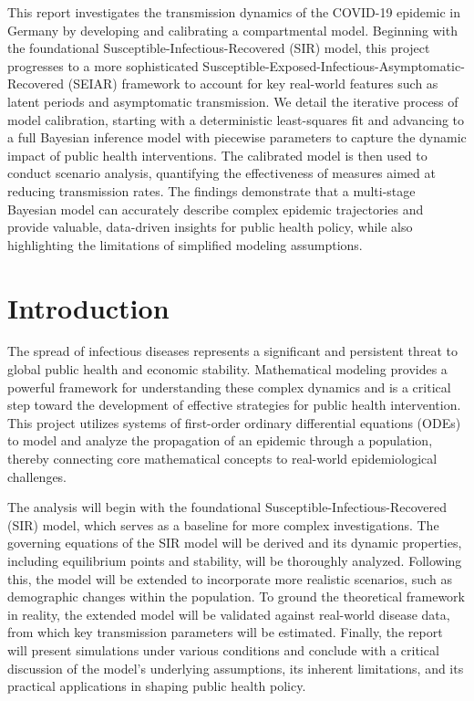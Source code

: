 \documentclass[12pt, a4paper]{article}
\renewenvironment{abstract}
 {\normalsize
  \begin{center}
  \bfseries \abstractname
  \end{center}
  \list{}{\setlength{\leftmargin}{0em}\setlength{\rightmargin}{\leftmargin}}%
  \item\relax}
 {\endlist}
\begin{document}
\begin{abstract}
    This report investigates the transmission dynamics of the COVID-19 epidemic in Germany by developing and calibrating a compartmental model. Beginning with the foundational Susceptible-Infectious-Recovered (SIR) model, this project progresses to a more sophisticated Susceptible-Exposed-Infectious-Asymptomatic-Recovered (SEIAR) framework to account for key real-world features such as latent periods and asymptomatic transmission. We detail the iterative process of model calibration, starting with a deterministic least-squares fit and advancing to a full Bayesian inference model with piecewise parameters to capture the dynamic impact of public health interventions. The calibrated model is then used to conduct scenario analysis, quantifying the effectiveness of measures aimed at reducing transmission rates. The findings demonstrate that a multi-stage Bayesian model can accurately describe complex epidemic trajectories and provide valuable, data-driven insights for public health policy, while also highlighting the limitations of simplified modeling assumptions.
\end{abstract}
\clearpage
\tableofcontents
\newpage


\section{Introduction}
The spread of infectious diseases represents a significant and persistent threat to global public health and economic stability. Mathematical modeling provides a powerful framework for understanding these complex dynamics and is a critical step toward the development of effective strategies for public health intervention. This project utilizes systems of first-order ordinary differential equations (ODEs) to model and analyze the propagation of an epidemic through a population, thereby connecting core mathematical concepts to real-world epidemiological challenges.

The analysis will begin with the foundational Susceptible-Infectious-Recovered (SIR) model, which serves as a baseline for more complex investigations. The governing equations of the SIR model will be derived and its dynamic properties, including equilibrium points and stability, will be thoroughly analyzed. Following this, the model will be extended to incorporate more realistic scenarios, such as demographic changes within the population. To ground the theoretical framework in reality, the extended model will be validated against real-world disease data, from which key transmission parameters will be estimated. Finally, the report will present simulations under various conditions and conclude with a critical discussion of the model's underlying assumptions, its inherent limitations, and its practical applications in shaping public health policy.
\end{document}
